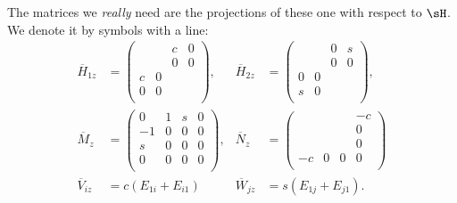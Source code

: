 The matrices we \emph{really} need are the projections of these one with respect to $\sH$. We denote it by  symbols with a line:
\begin{subequations}
	\begin{align}
		\overline{H}_{1z} & =
		\begin{pmatrix}
			  &   & c & 0 \\
			  &   & 0 & 0 \\
			c & 0 &   &   \\
			0 & 0 &   &   \\
		\end{pmatrix},
		                  & \overline{H}_{2z} & =
		\begin{pmatrix}
			  &   & 0 & s \\
			  &   & 0 & 0 \\
			0 & 0 &   &   \\
			s & 0 &   &   \\
		\end{pmatrix},                                             \\
		\overline{M}_z    & =
		\begin{pmatrix}
			0  & 1 & s & 0 \\
			-1 & 0 & 0 & 0 \\
			s  & 0 & 0 & 0 \\
			0  & 0 & 0 & 0 \\
		\end{pmatrix},
		                  & \overline{N}_z    & =
		\begin{pmatrix}
			   &   &   & -c \\
			   &   &   & 0  \\
			   &   &   & 0  \\
			-c & 0 & 0 & 0  \\
		\end{pmatrix}                                            \\
		\overline{V}_{iz} & =c(E_{1i}+E_{i1})
		                  & \overline{W}_{jz} & =s(E_{1j}+E_{j1}).
	\end{align}
\end{subequations}

